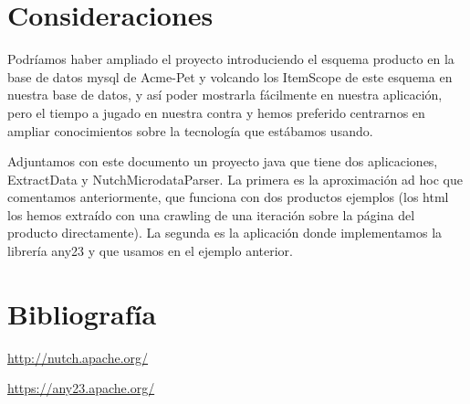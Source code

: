 \documentclass[a4paper]{article}
\begin{document}
\section{Consideraciones}
Podríamos haber ampliado el proyecto introduciendo el esquema producto en la base de datos mysql de Acme-Pet y volcando los ItemScope de este esquema en nuestra base de datos, y así poder mostrarla fácilmente en nuestra aplicación, pero el tiempo a jugado en nuestra contra y hemos preferido centrarnos en ampliar conocimientos sobre la tecnología que estábamos usando.

Adjuntamos con este documento un proyecto java que tiene dos aplicaciones, ExtractData y NutchMicrodataParser. La primera es la aproximación ad hoc que comentamos anteriormente, que funciona con dos productos ejemplos (los html los hemos extraído con una crawling de una iteración sobre la página del producto directamente). La segunda es la aplicación donde implementamos la librería any23 y que usamos en el ejemplo anterior.

\section{Bibliografía}

\url{http://nutch.apache.org/}

\url{https://any23.apache.org/}
\end{document}

